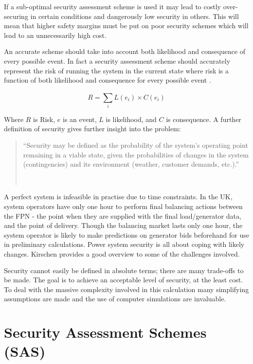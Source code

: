 \documentclass[a4paper,oneside,12pt]{report}
\newcommand{\tmpquotecite}{}%
\newenvironment{myquote}[1][]
{\renewcommand{\tmpquotecite}{#1}\begin{quote}\begin{itshape}``}
{''\end{itshape}~{\normalfont~\tmpquotecite}\end{quote}}
\begin{document}
If a sub-optimal security assessment scheme is used it may lead to costly over-securing in certain conditions and dangerously low security in others. This will mean that higher safety margins must be put on poor security schemes which will lead to an unnecessarily high cost.

An accurate scheme should take into account both likelihood and consequence of every possible event. In fact a security assessment scheme should accurately represent the risk of running the system in the current state where risk is a function of both likelihood and consequence for every possible event \cite{Billinton1997}.

\begin{equation}
  \label{eqn_risk}
  R = \sum\limits_{i}^{} L (e_i) \times C(e_i)
\end{equation}

Where $R$ is Risk, $e$ is an event, $L$ is likelihood, and $C$ is consequence. A further definition of security \cite{Balu1992} gives further insight into the problem:

\begin{myquote}[\cite{Balu1992}]Security may be defined as the probability of the system's operating point remaining in a viable state, given the probabilities of changes in the system (contingencies) and its environment (weather, customer demands, etc.).\end{myquote}

A perfect system is infeasible in practise due to time constraints. In the UK, system operators have only one hour to perform final balancing actions between the FPN - the point when they are supplied with the final load/generator data, and the point of delivery. Though the balancing market lasts only one hour, the system operator is likely to make predictions on generator bids beforehand for use in preliminary calculations. Power system security is all about coping with likely changes. Kirschen \cite{Kirschen2002} provides a good overview to some of the challenges involved.

Security cannot easily be defined in absolute terms; there are many trade-offs to be made. The goal is to achieve an acceptable level of security, at the least cost. To deal with the massive complexity involved in this calculation many simplifying assumptions are made and the use of computer simulations are invaluable.

\section{Security Assessment Schemes (SAS)}
\end{document}
